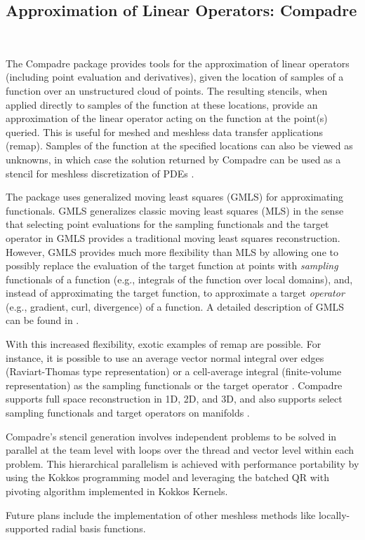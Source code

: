 \subsection{Approximation of Linear Operators: Compadre}\
\label{sec:compadre}

The Compadre package provides tools for the approximation of linear operators (including point evaluation and derivatives), given the location of samples of a function over an unstructured cloud of points. The resulting stencils, when applied directly to samples of the function at these locations, provide an approximation of the linear operator acting on the function at the point(s) queried. This is useful for meshed and meshless data transfer applications (remap). Samples of the function at the specified locations can also be viewed as unknowns, in which case the solution returned by Compadre can be used as a stencil for meshless discretization of PDEs \cite{REBAR2024}.

The package uses generalized moving least squares (GMLS) for approximating functionals. GMLS generalizes classic moving least squares (MLS) in the sense that selecting point evaluations for the sampling functionals and the target operator in GMLS provides a traditional moving least squares reconstruction. However, GMLS provides much more flexibility than MLS by allowing one to possibly replace the evaluation of the target function at points with \emph{sampling} functionals of a function (e.g., integrals of the function over local domains),  and, instead of approximating the target function, to approximate a target \emph{operator} (e.g., gradient, curl, divergence) of a function. A detailed description of GMLS can be found in \cite{mirzaei2012generalized,wendland2004scattered}.

With this increased flexibility, exotic examples of remap are possible. For instance, it is possible to use an average vector normal integral over edges (Raviart-Thomas type representation) or a cell-average integral (finite-volume representation) as the sampling functionals or the target operator \cite{gmd-15-6601-2022}. Compadre supports full space reconstruction in 1D, 2D, and 3D, and also supports select sampling functionals and target operators on manifolds \cite{GROSS2020109340}.

Compadre's stencil generation involves independent problems to be solved in parallel at the team level with loops over the thread and vector level within each problem. This hierarchical parallelism is achieved with performance portability by using the Kokkos programming model and leveraging the batched QR with pivoting algorithm implemented in Kokkos Kernels.

Future plans include the implementation of other meshless methods like locally-supported radial basis functions.

